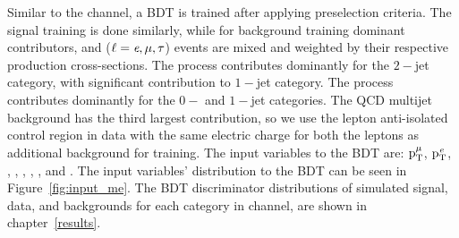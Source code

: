 Similar to the \muhad channel, a BDT is trained after applying preselection criteria. The signal training is done similarly, while for background training dominant contributors, \ttbar and \Zll ($\ell=\textit{e}, \mu, \tau$) events are mixed and weighted by their respective production cross-sections. The \ttbar process contributes dominantly for the $2-$jet category, with significant contribution to $1-$jet category. The \Zll process contributes dominantly for the $0-$ and $1-$jet categories. The QCD multijet background has the third largest contribution, so we use the lepton anti-isolated control region in data with the same electric charge for both the leptons as additional background for training. The input variables to the BDT are: $\text{p}_\text{T}^{\mu}$, $\text{p}_\text{T}^{\textit{e}}$, \mcol, \mtmmet, \mtemet, \dphiem, \dphimmet, and \dphiemet. The input variables' distribution to the BDT can be seen in Figure~\ref{fig:input_me}. The BDT discriminator distributions of simulated signal, data, and backgrounds for each category in \mue channel, are shown in chapter~\ref{results}.


